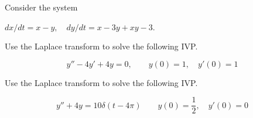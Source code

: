 \documentclass[12pt]{exam}
\begin{document}
\begin{questions}
    

\newpage \InitialsRight
    \question[10] 
    Consider the system 
    
    
    $\displaystyle dx/dt = x-y, \quad dy/dt = x-3y+xy - 3$. %

    
    

    


    
    

\newpage \InitialsLeft

    \question[10] Use the Laplace transform to solve the following IVP.

    $$\displaystyle y''-4y'+4y=0,\qquad y(0)=1,\quad y'(0)=1$$ %
    

\newpage \InitialsRight

    \question[10] Use the Laplace transform to solve the following IVP.

    $$\displaystyle y''+4y=10\delta(t-4\pi)\qquad y(0)=\frac12,\quad y'(0)=0 $$ %



    
\end{questions}
\end{document}
